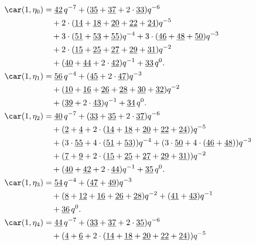 \begin{align*}
	\car(1,\eta_{0})
	&=\underline{42}\,q^{-7}+(\underline{35}+\underline{37}+2\cdot\underline{33})q^{-6}\\
	&\quad+2\cdot(\underline{14}+\underline{18}+\underline{20}+\underline{22}+\underline{24})q^{-5}\\
	&\quad+3\cdot(\underline{51}+\underline{53}+\underline{55})q^{-4}+3\cdot(\underline{46}+\underline{48}+\underline{50})q^{-3}\\
	&\quad+2\cdot(\underline{15}+\underline{25}+\underline{27}+\underline{29}+\underline{31})q^{-2}\\
	&\quad+(\underline{40}+\underline{44}+2\cdot\underline{42})q^{-1}+\underline{33}\,q^0.\\
	\car(1,\eta_{1})
	&=\underline{56}\,q^{-4}+(\underline{45}+2\cdot\underline{47})q^{-3}\\
	&\quad+(\underline{10}+\underline{16}+\underline{26}+\underline{28}+\underline{30}+\underline{32})q^{-2}\\
	&\quad+(\underline{39}+2\cdot\underline{43})q^{-1}+\underline{34}\,q^0.\\
	\car(1,\eta_{2})
	&=\underline{40}\,q^{-7}+(\underline{33}+\underline{35}+2\cdot\underline{37})q^{-6}\\
	&\quad+(\underline{2}+\underline{4}+2\cdot(\underline{14}+\underline{18}+\underline{20}+\underline{22}+\underline{24}))q^{-5}\\
	&\quad+(3\cdot\underline{55}+4\cdot(\underline{51}+\underline{53}))q^{-4}+(3\cdot\underline{50}+4\cdot(\underline{46}+\underline{48}))q^{-3}\\
	&\quad+(\underline{7}+\underline{9}+2\cdot(\underline{15}+\underline{25}+\underline{27}+\underline{29}+\underline{31}))q^{-2}\\
	&\quad+(\underline{40}+\underline{42}+2\cdot\underline{44})q^{-1}+\underline{35}\,q^0.\\
	\car(1,\eta_{3})
	&=\underline{54}\,q^{-4}+(\underline{47}+\underline{49})q^{-3}\\
	&\quad+(\underline{8}+\underline{12}+\underline{16}+\underline{26}+\underline{28})q^{-2}+(\underline{41}+\underline{43})q^{-1}\\
	&\quad+\underline{36}\,q^0.\\
	\car(1,\eta_{4})
	&=\underline{44}\,q^{-7}+(\underline{33}+\underline{37}+2\cdot\underline{35})q^{-6}\\
	&\quad+(\underline{4}+\underline{6}+2\cdot(\underline{14}+\underline{18}+\underline{20}+\underline{22}+\underline{24}))q^{-5}\\

\end{align*}
